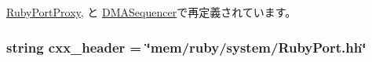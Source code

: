 \hyperlink{classSequencer_1_1RubyPortProxy_a6b007d00105ce28d41448c23f68c5ec1}{RubyPortProxy}, と \hyperlink{classSequencer_1_1DMASequencer_a6b007d00105ce28d41448c23f68c5ec1}{DMASequencer}で再定義されています。\hypertarget{classSequencer_1_1RubyPort_a17da7064bc5c518791f0c891eff05fda}{
\subsubsection[{cxx\_\-header}]{\setlength{\rightskip}{0pt plus 5cm}string {\bf cxx\_\-header} = \char`\"{}mem/ruby/{\bf system}/RubyPort.hh\char`\"{}}}
\label{classSequencer_1_1RubyPort_a17da7064bc5c518791f0c891eff05fda}


